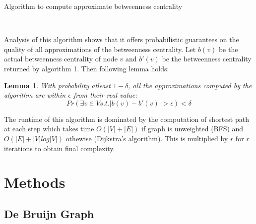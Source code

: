 \documentclass[runningheads,a4paper]{llncs}
\newtheorem{mylemma}{Lemma}
\begin{document}
\begin{algorithm}
\caption{Algorithm to compute approximate betweenness centrality}
\begin {algorithmic}[1]
\EndFor 
{}
\EndIf
{}
\EndWhile
\EndIf
\EndFor\\
\end{algorithmic}
\end{algorithm}

Analysis of this algorithm shows that it offers probabilistic guarantees on the quality of all approximations of the betweenness centrality. Let $b(v)$ be the actual betweenness centrality of node $v$ and $b'(v)$ be the betweenness centrality returned by algorithm 1. Then following lemma holds:

\begin{mylemma}
With probability atleast $1-\delta$, all the approximations computed by the algorithm are within $\epsilon$ from their real value:
$$Pr(\exists v \in V s.t. |b(v) - b'(v)| > \epsilon) < \delta$$
\end{mylemma}

The runtime of this algorithm is dominated by the computation of shortest path at each step which takes time $O(|V| + |E|)$ if graph is unweighted (BFS) and $O(|E| + |V|log|V|)$ othewise (Dijkstra's algorithm). This is multiplied by $r$ for $r$ iterations to obtain final complexity.


\section{Methods}

\subsection*{De Bruijn Graph} 
\end{document}
